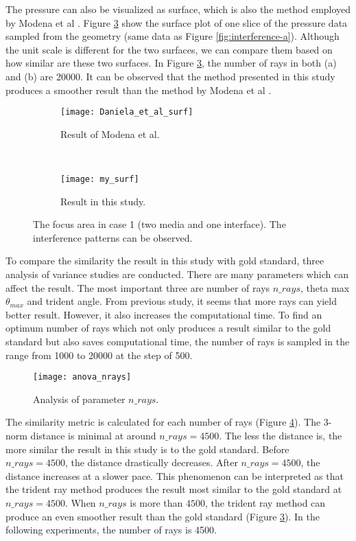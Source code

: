 The pressure can also be visualized as surface, which is also the method employed by Modena et al \cite{Modena_2018}. Figure \ref{fig:surface} show the surface plot of one slice of the pressure data sampled from the geometry (same data as Figure \ref{fig:interference-a}). Although the unit scale is different for the two surfaces, we can compare them based on how similar are these two surfaces. In Figure \ref{fig:surface}, the number of rays in both (a) and (b) are 20000. It can be observed that the method presented in this study produces a smoother result than the method by Modena et al \cite{Modena_2018}.

\begin{figure}[h]
    \centering
    \begin{subfigure}[b]{0.45\textwidth}
        \texttt{[image: Daniela\_et\_al\_surf]}
        \caption{Result of Modena et al.}
        \label{fig:surface-a}
    \end{subfigure}
    ~ %
    \begin{subfigure}[b]{0.45\textwidth}
        \texttt{[image: my\_surf]}
        \caption{Result in this study.}
        \label{fig:surface-b}
    \end{subfigure}
    \caption{The focus area in case 1 (two media and one interface). The interference patterns can be observed.} \label{fig:surface}
\end{figure}

To compare the similarity the result in this study with gold standard, three analysis of variance studies are conducted. There are many parameters which can affect the result. The most important three are number of rays $n\_rays$, theta max $\theta_{max}$ and trident angle. From previous study, it seems that more rays can yield better result. However, it also increases the computational time. To find an optimum number of rays which not only produces a result similar to the gold standard but also saves computational time, the number of rays is sampled in the range from 1000 to 20000 at the step of 500.

\begin{figure}[h]
    \centering
    \texttt{[image: anova\_nrays]}
    \caption{Analysis of parameter $n\_rays$.}
    \label{fig:anova_nrays}
\end{figure}

The similarity metric is calculated for each number of rays (Figure \ref{fig:anova_nrays}). The 3-norm distance is minimal at around $n\_rays=4500$. The less the distance is, the more similar the result in this study is to the gold standard. Before $n\_rays=4500$, the distance drastically decreases. After $n\_rays=4500$, the distance increases at a slower pace. This phenomenon can be interpreted as that the trident ray method produces the result most similar to the gold standard at $n\_rays=4500$. When $n\_rays$ is more than $4500$, the trident ray method can produce an even smoother result than the gold standard (Figure \ref{fig:surface}). In the following experiments, the number of rays is 4500. 

